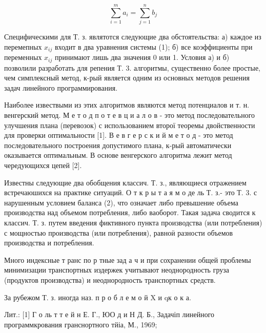 \documentclass[10pt]{article}
\begin{document}
\[

\sum_{i=1}^{m} a_{i}=\sum_{j=1}^{n} b_{j}

\]



Специфическими для Т. з. являтотся следующие два обстоятельства: а) каждое из перемепных $x_{i j}$ входит в два уравнения системы (1); б) все коэффициенты при переменных $x_{i j}$ принимают лишь два значения 0 или 1. Условия а) и б) позволили разработать для репения Т. 3. алгоритмы, существенно более простые, чем симплексный метод, к-рый является одним из основных методов решения задач линейного программирования.



Наиболее извествыми из этих алгоритмов являются метод потенциалов и т. н. венгерский метод. М е т о д п о т е в ц и а л о в - это метод последовательного улучшения плана (перевозок) с использованием второї теоремы двойственности для проверки оптимальности [1]. В е в г е р с к и й м е т о д - это метод последовательного построения допустимого плана, к-рый автоматически оказывается оптимальным. В основе венгерского алгоритма лежит метод чередующихся цепей [2].



Известны следующие два обобщения классич. Т. з., являющиеся отражением встречаюшихся на практике ситуаций. О т к р ы т а я м о де ль Т. з.- это Т. 3. с нарушенным условием баланса (2), что означает либо превышение объема производства над объемом потребления, либо ваоборот. Такая задача сводится к классич. Т. з. путем введения фиктивного пункта производства (или потребления) с мощностью производства (или потребления), равноӥ разности объемов производства и потребления.



Много индексные т ранс по р тные зад а ч и при сохранении общей проблемы минимизации транспортных издержек учитывают неоднородность груза (продуктов производства) и неоднородность транспортных средств.



За рубежом Т. з. иногда наз. п р о б л е м о й $\mathrm{X}$ и qк $о$ к а.



Лит.: [1] Г о ль т т е й н Е. Г., ЮО д и Н Д. Б., Задачіп линейного программкрования гранснортного тйіа, М., 1969;
\end{document}
